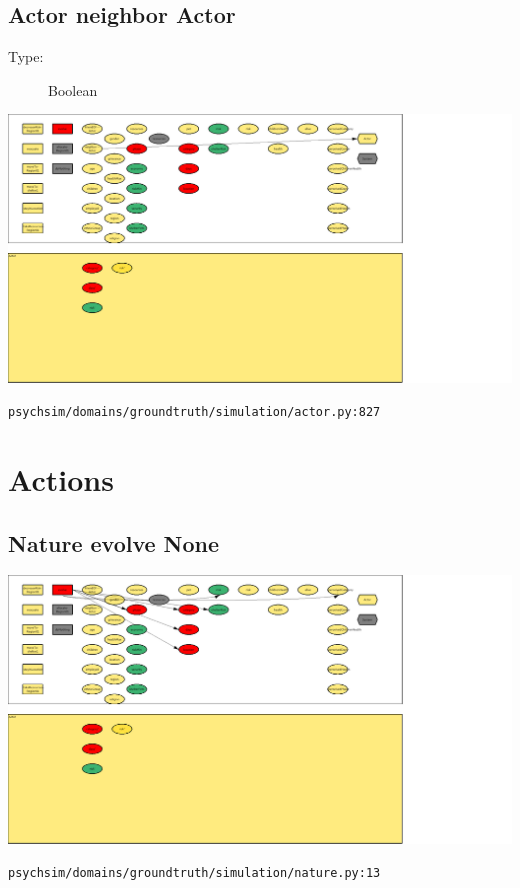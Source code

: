 \documentclass{article}%
\begin{document}
%
\subsection{Actor neighbor Actor}%
\label{subsec:Actor neighbor Actor}%
\begin{description}%
\item[Type:]%
Boolean%
\end{description}%
\includegraphics[width=\textwidth]{images/Actorneighbor--Actor.png}%
\begin{flushleft}%
\verb|psychsim/domains/groundtruth/simulation/actor.py:827|%
\end{flushleft}

%
\section{Actions}%
\label{sec:Actions}%
\subsection{Nature evolve None}%
\label{subsec:Nature evolve None}%
\includegraphics[width=\textwidth]{images/Nature-evolve.png}%
\begin{flushleft}%
\verb|psychsim/domains/groundtruth/simulation/nature.py:13|%
\end{flushleft}%
\end{document}
